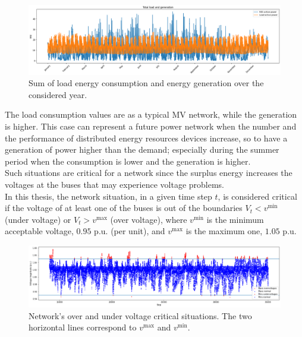 \begin{figure}[H]
\centering
    \includegraphics[width=1\linewidth]{images/MVOberr/Load&Gens.png}
\caption[Consumed and generated energy]{Sum of load energy consumption and energy generation over the considered year.}
\end{figure}

The load consumption values are as a typical MV network, while the generation is higher. This case can represent a future power network when the number and the performance of distributed energy resources devices increase, so to have a generation of power higher than the demand; especially during the summer period when the consumption is lower and the generation is higher.\\
Such situations are critical for a network since the surplus energy increases the voltages at the buses that may experience voltage problems.\\


In this thesis, the network situation, in a given time step $t$, is considered critical if the voltage of at least one of the buses is out of the boundaries $V_t < v^{\text{min}}$ (under voltage) or $V_t > v^{\text{max}}$ (over voltage), where $v^{\text{min}}$ is the minimum acceptable voltage, $0.95$ p.u. (per unit), and $v^{\text{max}}$ is the maximum one, $1.05$ p.u.\\
\begin{figure}[H]
\centering
    \includegraphics[width=1\linewidth]{images/MVOberr/CritialSituationsBefore.png}
\caption[Network's critical situations]{Network's over and under voltage critical situations. The two horizontal lines correspond to $v^{\text{max}}$ and $v^{\text{min}}$.}
\label{fig:ctb}
\end{figure}

